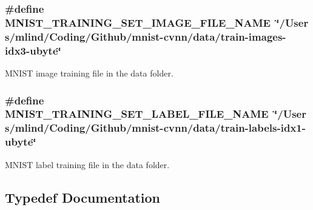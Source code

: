 \subsubsection[{M\+N\+I\+S\+T\+\_\+\+T\+R\+A\+I\+N\+I\+N\+G\+\_\+\+S\+E\+T\+\_\+\+I\+M\+A\+G\+E\+\_\+\+F\+I\+L\+E\+\_\+\+N\+A\+M\+E}]{\setlength{\rightskip}{0pt plus 5cm}\#define M\+N\+I\+S\+T\+\_\+\+T\+R\+A\+I\+N\+I\+N\+G\+\_\+\+S\+E\+T\+\_\+\+I\+M\+A\+G\+E\+\_\+\+F\+I\+L\+E\+\_\+\+N\+A\+M\+E~\char`\"{}/Users/mlind/Coding/Github/mnist-\/cvnn/data/train-\/images-\/idx3-\/ubyte\char`\"{}}\label{mnist-utils_8h_ad46661079c809c87a6417a2831b1f33a}


M\+N\+I\+S\+T image training file in the data folder. 

\hypertarget{mnist-utils_8h_a37971d2433c703aebccf946f2cf1a10a}{}
\subsubsection[{M\+N\+I\+S\+T\+\_\+\+T\+R\+A\+I\+N\+I\+N\+G\+\_\+\+S\+E\+T\+\_\+\+L\+A\+B\+E\+L\+\_\+\+F\+I\+L\+E\+\_\+\+N\+A\+M\+E}]{\setlength{\rightskip}{0pt plus 5cm}\#define M\+N\+I\+S\+T\+\_\+\+T\+R\+A\+I\+N\+I\+N\+G\+\_\+\+S\+E\+T\+\_\+\+L\+A\+B\+E\+L\+\_\+\+F\+I\+L\+E\+\_\+\+N\+A\+M\+E~\char`\"{}/Users/mlind/Coding/Github/mnist-\/cvnn/data/train-\/labels-\/idx1-\/ubyte\char`\"{}}\label{mnist-utils_8h_a37971d2433c703aebccf946f2cf1a10a}


M\+N\+I\+S\+T label training file in the data folder. 



\subsection{Typedef Documentation}
\hypertarget{mnist-utils_8h_ac86380de7c7c685ea8e992a27f671239}{}
